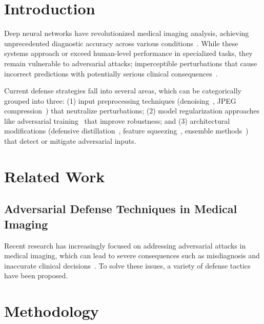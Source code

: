\documentclass[preprint,12pt]{elsarticle}
\begin{document}


\section{Introduction}
\label{sec:introduction}

Deep neural networks have revolutionized medical imaging analysis, achieving unprecedented diagnostic accuracy across various conditions~\cite{Mamo24}. While these systems approach or exceed human-level performance in specialized tasks, they remain vulnerable to adversarial attacks; imperceptible perturbations that cause incorrect predictions with potentially serious clinical consequences~\cite{Bortsova21, Kaviani22}.

Current defense strategies fall into several areas, which can be categorically grouped into three: (1) input preprocessing techniques (denoising~\cite{Chiang20}, JPEG compression~\cite{Cheng21}) that neutralize perturbations; (2) model regularization approaches like adversarial training~\cite{Muoka23} that improve robustness; and (3) architectural modifications (defensive distillation~\cite{Qi24}, feature squeezing~\cite{vasan2024}, ensemble methods~\cite{Alzubaidi24}) that detect or mitigate adversarial inputs. 


\section{Related Work}
\label{sec:related_work}

\subsection{Adversarial Defense Techniques in Medical Imaging}
Recent research has increasingly focused on addressing adversarial attacks in medical imaging, which can lead to severe consequences such as misdiagnosis and inaccurate clinical decisions~\cite{Dhamija24}. To solve these issues, a variety of defense tactics have been proposed.


\section{Methodology}
\label{sec:methodology}
\end{document}
